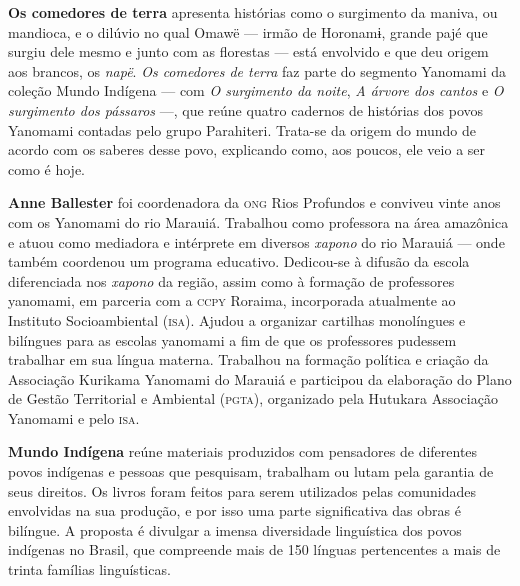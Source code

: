 \textbf{Os comedores de terra} apresenta histórias como o surgimento da maniva, ou mandioca, e o dilúvio no qual Omawë --- irmão de Horonamɨ, grande pajé que surgiu dele mesmo e junto com as florestas --- está envolvido e que deu origem aos brancos, os \textit{napë}. \textit{Os comedores de terra} faz parte do segmento Yanomami da coleção Mundo Indígena --- com \textit{O surgimento da noite}, \textit{A árvore dos cantos} e \textit{O surgimento dos pássaros} ---, que reúne quatro cadernos de histórias dos povos Yanomami contadas pelo grupo Parahiteri. Trata-se da origem do mundo de acordo com os saberes desse povo, explicando como, aos poucos, ele veio a ser como é hoje.

\textbf{Anne Ballester} foi coordenadora da \textsc{ong} Rios Profundos e conviveu vinte anos com os Yanomami do rio Marauiá. Trabalhou como professora na área amazônica e atuou como mediadora e intérprete em diversos \textit{xapono} do rio Marauiá --- onde também coordenou um programa educativo. Dedicou-se à difusão da escola diferenciada nos \textit{xapono} da região, assim como à formação de professores yanomami, em parceria com a \textsc{ccpy} Roraima, incorporada atualmente ao Instituto Socioambiental (\textsc{isa}). Ajudou a organizar cartilhas monolíngues e bilíngues para as escolas yanomami a fim de que os professores pudessem trabalhar em sua língua materna. Trabalhou na formação política e criação da Associação Kurikama Yanomami do Marauiá e participou da elaboração do Plano de Gestão Territorial e Ambiental (\textsc{pgta}), organizado pela Hutukara Associação Yanomami e pelo \textsc{isa}.

\textbf{Mundo Indígena} reúne materiais produzidos com pensadores de diferentes povos indígenas e pessoas que pesquisam, trabalham ou lutam pela garantia de seus direitos. Os livros foram feitos para serem utilizados pelas comunidades envolvidas na sua produção, e por isso uma parte significativa das obras é bilíngue. A proposta é divulgar a imensa diversidade linguística dos povos indígenas no Brasil, que compreende mais de 150 línguas pertencentes a mais de trinta famílias linguísticas.




